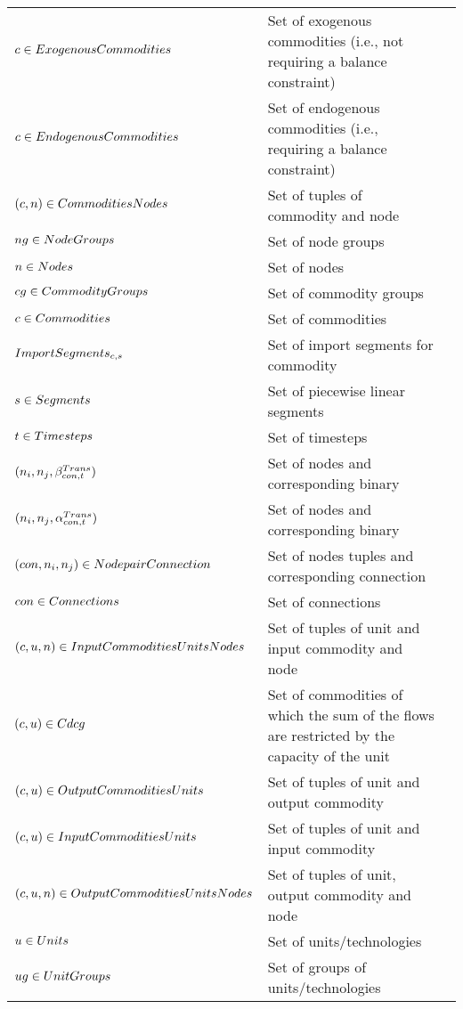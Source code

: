 	\begin{longtable}{p{\cola} p{\colc} >{\small\raggedleft\arraybackslash\itshape}p{\colb}}
		$c \in ExogenousCommodities$	& Set of exogenous commodities (i.e., not requiring a balance constraint)	&                \\
		$c \in EndogenousCommodities$	& Set of endogenous commodities (i.e., requiring a balance constraint)	&                \\
		$(c, n) \in CommoditiesNodes$	& Set of tuples of commodity and node                         	&                \\
		$ng \in NodeGroups    $	& Set of node groups                                          	&                \\
		$n \in Nodes         $	& Set of nodes                                                	&                \\
		$cg \in CommodityGroups$	& Set of commodity groups                                     	&                \\
		$c \in Commodities   $	& Set of commodities                                          	&                \\
		$ImportSegments_{c,s}$	& Set of import segments \segment for commodity \commodity    	&                \\
		$s \in Segments      $	& Set of piecewise linear segments                            	&                \\
		$t \in Timesteps     $	& Set of timesteps                                            	&                \\
		$(n_i,n_j,\beta^{Trans}_{{con},t})       $	& Set of nodes and corresponding binary                       	&                \\
		$(n_i,n_j,\alpha^{Trans}_{{con},t})      $	& Set of nodes and corresponding binary                       	&                \\
		$({con},n_i,n_j) \in NodepairConnection$	& Set of nodes tuples and corresponding connection            	&                \\
		${con} \in Connections   $	& Set of connections                                          	&                \\
		$(c, u, n) \in InputCommoditiesUnitsNodes$	& Set of tuples of unit and input commodity and node          	&                \\
		$(c, u) \in Cdcg          $	& Set of commodities of which the sum of the flows are restricted by the capacity of the unit	&                \\
		$(c, u) \in OutputCommoditiesUnits$	& Set of tuples of unit and output commodity                  	&                \\
		$(c, u) \in InputCommoditiesUnits$	& Set of tuples of unit and input commodity                   	&                \\
		$(c, u, n) \in OutputCommoditiesUnitsNodes$	& Set of tuples of unit, output commodity and node            	&                \\
		$u \in Units         $	& Set of units/technologies                                   	&                \\
		$ug \in UnitGroups    $	& Set of groups of units/technologies                         	&                \\
	\end{longtable}

